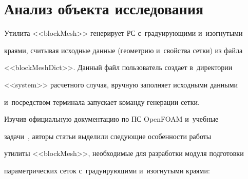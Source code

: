 \section{Анализ объекта исследования}





  Утилита <<blockMesh>> генерирует РС с~градуирующими и~изогнутыми 


краями, считывая исходные данные (геометрию и~свойства сетки) из файла 


<<blockMeshDict>>. Данный файл пользователь создает в~директории 


<<system>> расчетного случая, вручную заполняет исходными данными 


и~посредством терминала запускает команду генерации сетки. 


  


  Изучив официальную документацию по ПС OpenFOAM и~учебные 


задачи~\cite{8-ch}, авторы статьи выделили следующие особенности работы 


утилиты <<blockMesh>>, необходимые для разработки модуля подготовки 


параметрических сеток с~градуирующими и~изогнутыми краями:


